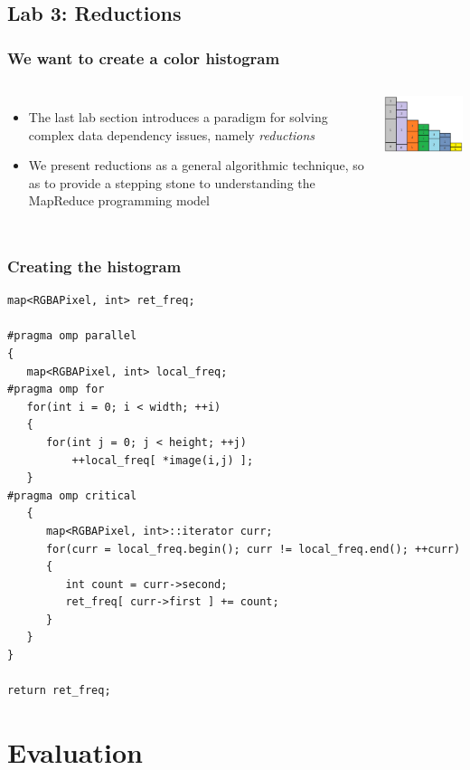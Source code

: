 \documentclass[table]{beamer}
\begin{document}
\subsection{Lab 3: Reductions}

\begin{frame}[fragile]
    \frametitle{We want to create a color histogram}
    \begin{columns}
        \begin{itemize}
            \item The last lab section introduces a paradigm for solving complex
                data dependency issues, namely {\em reductions}
            \item We present reductions as a general algorithmic technique, so
                as to  provide a stepping stone to understanding the MapReduce
                programming model
        \end{itemize}
        \includegraphics[width=2.2in]{chart.png}
    \end{columns}
\end{frame}

\begin{frame}[fragile]
    \frametitle{Creating the histogram}
    \begin{verbatim}
map<RGBAPixel, int> ret_freq;

#pragma omp parallel
{
   map<RGBAPixel, int> local_freq;
#pragma omp for
   for(int i = 0; i < width; ++i)
   {
      for(int j = 0; j < height; ++j)
          ++local_freq[ *image(i,j) ];
   }
#pragma omp critical
   {
      map<RGBAPixel, int>::iterator curr;
      for(curr = local_freq.begin(); curr != local_freq.end(); ++curr)
      {
         int count = curr->second;
         ret_freq[ curr->first ] += count;
      }
   }
}

return ret_freq;
    \end{verbatim}
\end{frame}

\section{Evaluation}
\end{document}
